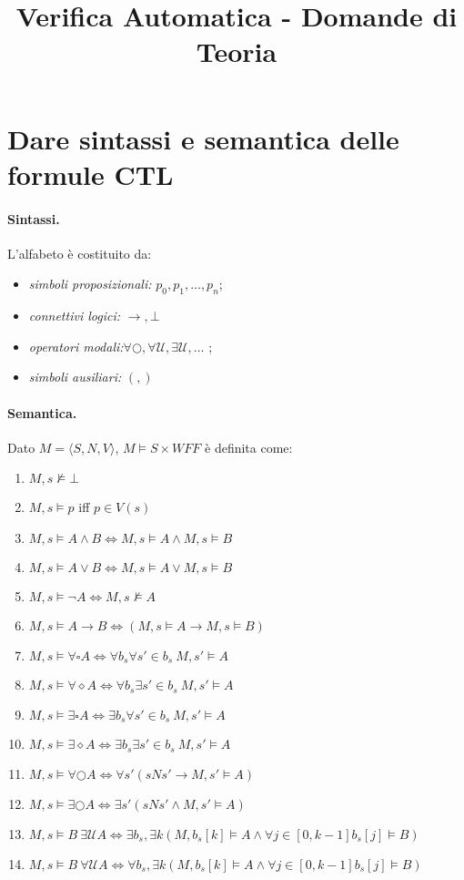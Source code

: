 \documentclass[a4paper,11pt]{article}
\title{\textbf{Verifica Automatica - Domande di Teoria}}
\date{}
\newcommand{\until}{\mathcal{U}}
\begin{document}
	\maketitle
	\section{Dare sintassi e semantica delle formule CTL}
	\paragraph{Sintassi.} L'alfabeto è costituito da:
	\begin{itemize}
		\item \textit{simboli proposizionali:} $p_0, p_1, \dots, p_n$;
		\item \textit{connettivi logici:} $\rightarrow, \bot$
		\item \textit{operatori modali:}$\forall \bigcirc, \forall \until, \exists \until, \dots$ ;
		\item \textit{simboli ausiliari:} $(,)$
	\end{itemize}

	\paragraph{Semantica.} Dato $M=\langle S,N,V \rangle$, $M \models S \times WFF$ è definita come:
	\begin{enumerate}
		\item $M, s \not\models \bot$
		\item $M, s \models p$ iff $p \in V(s)$
		\item $M, s \models A \wedge B \iff M, s \models A \wedge M, s \models B$
		\item $M, s \models A \vee B \iff M, s \models A \vee M, s \models B$
		\item $M,s \models \neg A \iff M, s \not\models A$
		\item $M, s \models A \rightarrow B \iff (M, s \models A \rightarrow M, s \models B)$
		\item $M, s \models \forall \square A \iff \forall b_s \forall s' \in b_s\ M, s' \models A$
		\item $M, s \models \forall \diamond A \iff \forall b_s \exists s' \in b_s\ M, s' \models A$
		\item $M, s \models \exists \square A \iff \exists b_s \forall s' \in b_s\ M, s' \models A$
		\item $M, s \models \exists \diamond A \iff \exists b_s \exists s' \in b_s\ M, s' \models A$
		\item $M, s \models \forall \bigcirc A \iff \forall s' (sNs' \rightarrow M, s' \models A)$
		\item $M, s \models \exists \bigcirc A \iff \exists s' (sNs' \wedge M, s' \models A)$
		\item $M, s \models B\ \exists \until A \iff \exists b_s, \exists k (M, b_s[k] \models A \wedge \forall j \in [0, k-1] b_s[j] \models B)$
		\item $M, s \models B\ \forall \until A \iff \forall b_s, \exists k (M, b_s[k] \models A \wedge \forall j \in [0, k-1] b_s[j] \models B)$
	\end{enumerate}
\end{document}
